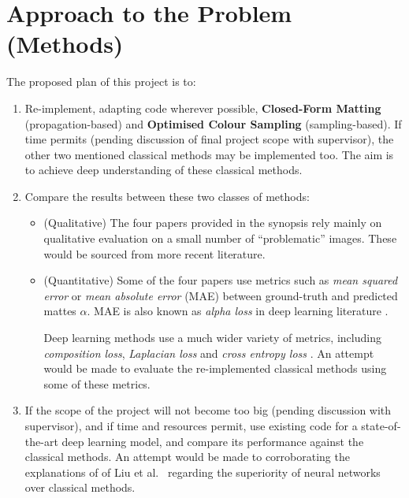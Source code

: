 \documentclass{article}
\begin{document}



\section{Approach to the Problem (Methods)}

The proposed plan of this project is to:
\begin{enumerate}[label=\arabic*.]
    \item Re-implement, adapting code wherever possible, \textbf{Closed-Form Matting} (propagation-based) and \textbf{Optimised Colour Sampling} (sampling-based). If time permits (pending discussion of final project scope with supervisor), the other two mentioned classical methods may be implemented too. The aim is to achieve deep understanding of these classical methods.
    \item Compare the results between these two classes of methods:
    \begin{itemize}
        \item (Qualitative) The four papers provided in the synopsis \cite{bayesian-matting, robust-matting, poisson-matting, closed-form-matting} rely mainly on qualitative evaluation on a small number of ``problematic'' images. These would be sourced from more recent literature.
        \item (Quantitative) Some of the four papers use metrics such as \emph{mean squared error} or \emph{mean absolute error} (MAE) between ground-truth and predicted mattes $\alpha$. MAE is also known as \emph{alpha loss} in deep learning literature \cite{dnn-survey}.

        Deep learning methods use a much wider variety of metrics, including \emph{composition loss}, \emph{Laplacian loss} and \emph{cross entropy loss} \cite{dnn-survey}. An attempt would be made to evaluate the re-implemented classical methods using some of these metrics.
    \end{itemize}
    \item If the scope of the project will not become too big (pending discussion with supervisor), and if time and resources permit, use existing code for a state-of-the-art deep learning model, and compare its performance against the classical methods. An attempt would be made to corroborating the explanations of of Liu et al.\ \cite{sota-composition-1k} regarding the superiority of neural networks over classical methods.
\end{enumerate}
\end{document}
